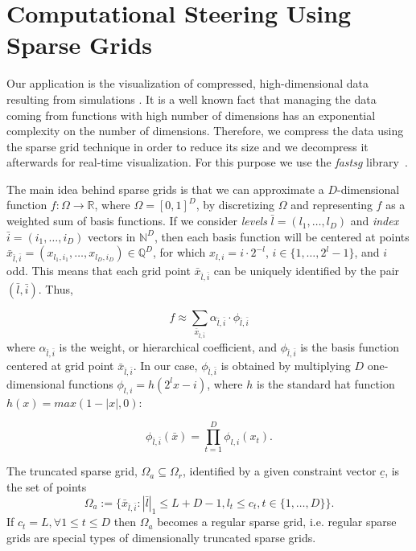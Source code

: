 \section{Computational Steering Using Sparse Grids}
\label{sec:comp_steering}

Our application is the visualization of compressed, high-dimensional data
resulting from simulations \cite{Butnaru201156}. It is a well known fact that
managing the data coming from functions with high number of dimensions has an
exponential complexity on the number of dimensions. Therefore, we compress the
data using the sparse grid technique in order to reduce its size and we
decompress it afterwards for real-time visualization. For this purpose we use
the \textit{fastsg} library~\cite{murarasu12fastsg:}.

The main idea behind sparse grids is that we can approximate a $D$-dimensional
function $f : \Omega \rightarrow \mathbb{R}$, where $\Omega = [0, 1]^{D}$, by
discretizing $\Omega$ and representing $f$ as a weighted sum of basis functions.
If we consider \textit{levels} $\bar{l} = (l_{1},\ldots,l_{D})$ and
\textit{index} $\bar{i} = (i_{1},\ldots,i_{D})$ vectors in $\mathbb{N}^{D}$,
then each basis function will be centered at points $\bar{x}_{\bar{l},\bar{i}} =
(x_{l_{1},i_{1}},\ldots,x_{l_{D},i_{D}}) \in \mathbb{Q}^{D}$, for which $x_{l,i}
= i \cdot 2^{-l}$, $i \in \{1,\ldots,2^{l} - 1\}$, and $i$ odd. This means that
each grid point $\bar{x}_{\bar{l},\bar{i}}$ can be uniquely identified by the
pair $(\bar{l},\bar{i})$. Thus,

\[ f \approx \sum_{\bar{x}_{\bar{l},\bar{i}}} \alpha_{\bar{l},\bar{i}} \cdot
\phi_{\bar{l},\bar{i}} \]
where $\alpha_{\bar{l},\bar{i}}$ is the weight, or hierarchical coefficient, and
$\phi_{\bar{l},\bar{i}}$ is the basis function centered at grid point
$\bar{x}_{\bar{l},\bar{i}}$. In our case, $\phi_{\bar{l},\bar{i}}$ is obtained
by multiplying $D$ one-dimensional functions $\phi_{l,i} = h(2^{l}x - i)$, where
$h$ is the standard hat function $h(x) = max(1 - |x|, 0)$:

\[ \phi_{\bar{l},\bar{i}}(\bar{x}) = \prod_{t=1}^{D} \phi_{l,i}(x_{t}) .\]

The truncated sparse grid, $\Omega_a \subseteq \Omega_r$, identified by a given constraint vector $\underline{c}$, is the set of points
\begin{equation*}
\Omega_a := \{\bar{x}_{\bar{l}, \bar{i}} : |\bar{l}|_1 \leq L
+ D - 1, l_t \leq c_t,  t \in \{1, \dots, D\}\}.
\end{equation*}
If $c_t = L, \forall 1 \leq t \leq D$ then $\Omega_a$ becomes a regular sparse grid, i.e. regular sparse grids are special types of dimensionally truncated sparse grids.


